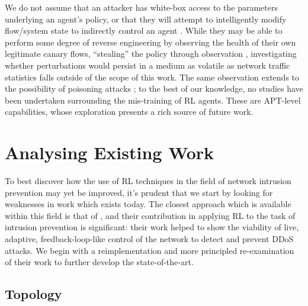 \documentclass[conference, letterpaper, 10pt, times]{IEEEtran}
\begin{document}
We do not assume that an attacker has white-box access to the parameters underlying an agent's policy, or that they will attempt to intelligently modify flow/system state to indirectly control an agent \cite{DBLP:conf/eurosp/PapernotMJFCS16, DBLP:conf/eurosp/PapernotMSW18, DBLP:journals/corr/HuangPGDA17, DBLP:conf/sp/Carlini017}.
While they may be able to perform some degree of reverse engineering by observing the health of their own legitimate canary flows, ``stealing'' the policy through observation \cite{DBLP:conf/uss/TramerZJRR16}, investigating whether perturbations would persist in a medium as volatile as network traffic statistics falls outside of the scope of this work.
The same observation extends to the possibility of poisoning attacks \cite{DBLP:journals/jmlr/KloftL10, DBLP:conf/acsac/ShenTS16}; to the best of our knowledge, no studies have been undertaken surrounding the mis-training of RL agents.
These are APT-level capabilities, whose exploration presents a rich source of future work.

\section{Analysing Existing Work}\label{sec:environment-and-rl-algorithm}
To best discover how the use of RL techniques in the field of network intrusion prevention may yet be improved, it's prudent that we start by looking for weaknesses in work which exists today.
The closest approach which is available within this field is that of \textcite{DBLP:journals/eaai/MalialisK15}, and their contribution in applying RL to the task of intrusion prevention is significant: their work helped to show the viability of live, adaptive, feedback-loop-like control of the network to detect and prevent DDoS attacks.
We begin with a reimplementation and more principled re-examination of their work to further develop the state-of-the-art.



\subsection{Topology}\label{sec:topology}
\end{document}
